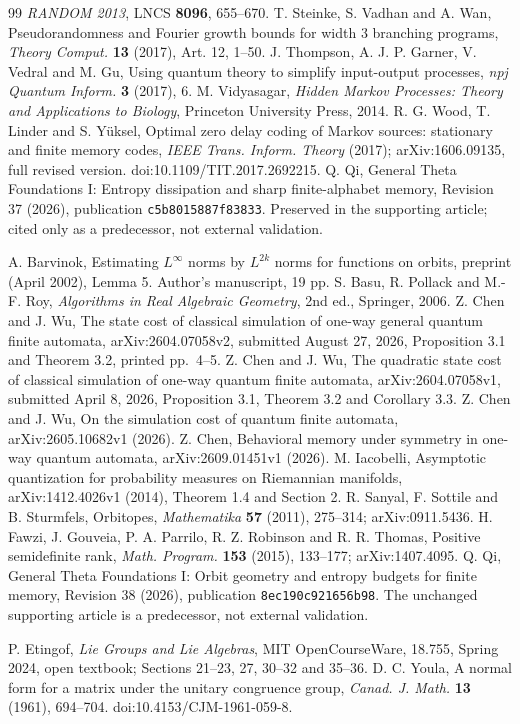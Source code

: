 \begin{thebibliography}{99}
\emph{RANDOM 2013}, LNCS \textbf{8096}, 655--670.
 T. Steinke, S. Vadhan and A. Wan,
Pseudorandomness and Fourier growth bounds for width 3 branching programs,
\emph{Theory Comput.} \textbf{13} (2017), Art. 12, 1--50.
 J. Thompson, A. J. P. Garner, V. Vedral and M. Gu,
Using quantum theory to simplify input-output processes,
\emph{npj Quantum Inform.} \textbf{3} (2017), 6.
 M. Vidyasagar,
\emph{Hidden Markov Processes: Theory and Applications to Biology},
Princeton University Press, 2014.
 R. G. Wood, T. Linder and S. Y\"uksel,
Optimal zero delay coding of Markov sources: stationary and finite memory codes,
\emph{IEEE Trans. Inform. Theory} (2017);
arXiv:1606.09135, full revised version.
doi:10.1109/TIT.2017.2692215.
 Q. Qi,
General Theta Foundations I: Entropy dissipation and sharp finite-alphabet memory,
Revision 37 (2026), publication \texttt{c5b8015887f83833}.
Preserved in the supporting article; cited only as a predecessor, not external validation.

 A. Barvinok,
Estimating $L^\infty$ norms by $L^{2k}$ norms for functions on orbits,
preprint (April 2002), Lemma 5. Author's manuscript, 19 pp.
 S. Basu, R. Pollack and M.-F. Roy,
\emph{Algorithms in Real Algebraic Geometry}, 2nd ed., Springer, 2006.
 Z. Chen and J. Wu,
The state cost of classical simulation of one-way general quantum finite automata,
arXiv:2604.07058v2, submitted August 27, 2026,
Proposition 3.1 and Theorem 3.2, printed pp.~4--5.
 Z. Chen and J. Wu,
The quadratic state cost of classical simulation of one-way quantum finite automata,
arXiv:2604.07058v1, submitted April 8, 2026,
Proposition 3.1, Theorem 3.2 and Corollary 3.3.
 Z. Chen and J. Wu,
On the simulation cost of quantum finite automata,
arXiv:2605.10682v1 (2026).
 Z. Chen,
Behavioral memory under symmetry in one-way quantum automata,
arXiv:2609.01451v1 (2026).
 M. Iacobelli,
Asymptotic quantization for probability measures on Riemannian manifolds,
arXiv:1412.4026v1 (2014), Theorem 1.4 and Section 2.
 R. Sanyal, F. Sottile and B. Sturmfels,
Orbitopes, \emph{Mathematika} \textbf{57} (2011), 275--314;
arXiv:0911.5436.
 H. Fawzi, J. Gouveia, P. A. Parrilo, R. Z. Robinson and R. R. Thomas,
Positive semidefinite rank, \emph{Math. Program.} \textbf{153} (2015), 133--177;
arXiv:1407.4095.
 Q. Qi,
General Theta Foundations I: Orbit geometry and entropy budgets for finite memory,
Revision 38 (2026), publication \texttt{8ec190c921656b98}.
The unchanged supporting article is a predecessor, not external validation.

 P. Etingof,
\emph{Lie Groups and Lie Algebras}, MIT OpenCourseWare,
18.755, Spring 2024, open textbook; Sections 21--23, 27, 30--32 and 35--36.
 D. C. Youla,
A normal form for a matrix under the unitary congruence group,
\emph{Canad. J. Math.} \textbf{13} (1961), 694--704.
doi:10.4153/CJM-1961-059-8.
\end{thebibliography}
